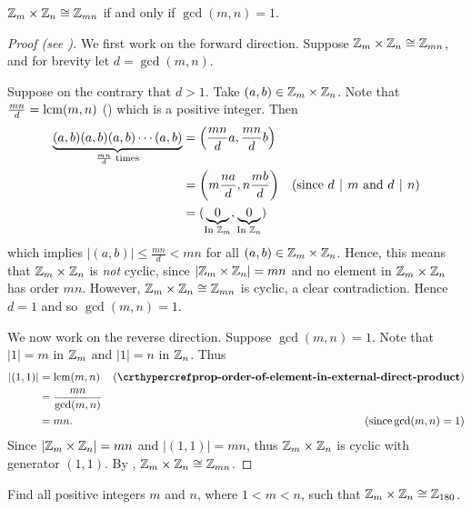 \begin{theorem}\label{thrm-Zm-cross-Zn-isomorphic-to-Zmn-condition}
    $\mathbb{Z}_m \times \mathbb{Z}_n \cong \mathbb{Z}_{mn}$ if and only if $\gcd(m,n) = 1$.
\end{theorem}
\begin{proof}[Proof (see {\cite[Proposition 13.1 (3)]{humphreys_1996}})]
    We first work on the forward direction. Suppose $\mathbb{Z}_m \times \mathbb{Z}_n \cong \mathbb{Z}_{mn}$, and for brevity let $d = \gcd(m,n)$.

    Suppose on the contrary that $d > 1$. Take $(a, b) \in \mathbb{Z}_m \times \mathbb{Z}_n$. Note that $\frac{mn}{d} = \mathrm{lcm}(m,n)$ () which is a positive integer. Then
    \begin{align*}
        \underbrace{(a,b)(a,b)(a,b)\cdots(a,b)}_{\frac{mn}{d}\text{ times}} &= \left(\frac{mn}{d}a, \frac{mn}{d}b\right)\\
        &= \left(m\frac{na}{d}, n\frac{mb}{d}\right) & (\text{since } d \vert m \text{ and } d \vert n)\\
        &= (\underbrace{0}_{\text{In } \Z_m}, \underbrace{0}_{\text{In } \Z_n})
    \end{align*}
    which implies $|(a, b)| \leq \frac{mn}{d} < mn$ for all $(a, b) \in \mathbb{Z}_m \times \mathbb{Z}_n$. Hence, this means that $\mathbb{Z}_m \times \mathbb{Z}_n$ is \textit{not} cyclic, since $|\mathbb{Z}_m \times \mathbb{Z}_n| = mn$ and no element in $\mathbb{Z}_m \times \mathbb{Z}_n$ has order $mn$. However, $\mathbb{Z}_m \times \mathbb{Z}_n \cong \mathbb{Z}_{mn}$ is cyclic, a clear contradiction. Hence $d = 1$ and so $\gcd(m,n) = 1$.

    We now work on the reverse direction. Suppose $\gcd(m,n) = 1$. Note that $|1| = m$ in $\mathbb{Z}_m$ and $|1| = n$ in $\mathbb{Z}_n$. Thus
    \begin{align*}
        |(1, 1)| &= \lcm(m, n) & (\myref{prop-order-of-element-in-external-direct-product})\\
        &= \frac{mn}{\gcd(m,n)}\\
        &= mn. & (\text{since} \gcd(m,n) = 1)
    \end{align*}
    Since $|\mathbb{Z}_m \times \mathbb{Z}_n| = mn$ and $|(1,1)| = mn$, thus $\mathbb{Z}_m \times \mathbb{Z}_n$ is cyclic with generator $(1,1)$. By , $\mathbb{Z}_m \times \mathbb{Z}_n \cong \mathbb{Z}_{mn}$.
\end{proof}

\begin{exercise}
    Find all positive integers $m$ and $n$, where $1 < m < n$, such that $\mathbb{Z}_m \times \mathbb{Z}_n \cong \mathbb{Z}_{180}$.
\end{exercise}

